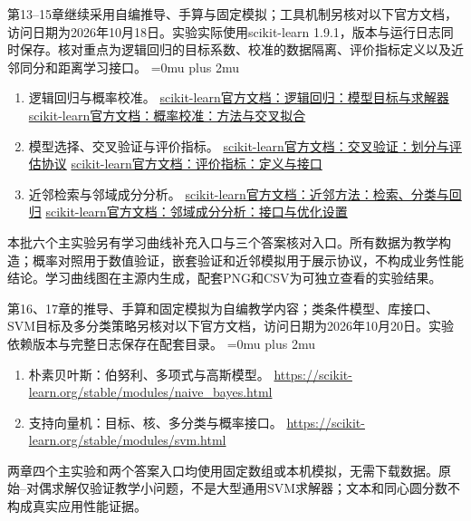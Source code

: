 \documentclass[UTF8,fontset=none,zihao=-4,a4paper]{ctexart}
\numberwithin{equation}{section}
\numberwithin{figure}{section}
\begin{document}
第13--15章继续采用自编推导、手算与固定模拟；工具机制另核对以下官方文档，访问日期为2026年10月18日。实验实际使用scikit-learn 1.9.1，版本与运行日志同时保存。核对重点为逻辑回归的目标系数、校准的数据隔离、评价指标定义以及近邻同分和距离学习接口。
\begingroup\Urlmuskip=0mu plus 2mu
\begin{enumerate}
\item 逻辑回归与概率校准。\newline
\href{https://scikit-learn.org/stable/modules/linear_model.html#logistic-regression}{scikit-learn官方文档：逻辑回归：模型目标与求解器}\newline
\href{https://scikit-learn.org/stable/modules/calibration.html}{scikit-learn官方文档：概率校准：方法与交叉拟合}
\item 模型选择、交叉验证与评价指标。\newline
\href{https://scikit-learn.org/stable/modules/cross_validation.html}{scikit-learn官方文档：交叉验证：划分与评估协议}\newline
\href{https://scikit-learn.org/stable/modules/model_evaluation.html}{scikit-learn官方文档：评价指标：定义与接口}
\item 近邻检索与邻域成分分析。\newline
\href{https://scikit-learn.org/stable/modules/neighbors.html}{scikit-learn官方文档：近邻方法：检索、分类与回归}\newline
\href{https://scikit-learn.org/stable/modules/generated/sklearn.neighbors.NeighborhoodComponentsAnalysis.html}{scikit-learn官方文档：邻域成分分析：接口与优化设置}
\end{enumerate}
\endgroup
本批六个主实验另有学习曲线补充入口与三个答案核对入口。所有数据为教学构造；概率对照用于数值验证，嵌套验证和近邻模拟用于展示协议，不构成业务性能结论。学习曲线图在主源内生成，配套PNG和CSV为可独立查看的实验结果。

第16、17章的推导、手算和固定模拟为自编教学内容；类条件模型、库接口、SVM目标及多分类策略另核对以下官方文档，访问日期为2026年10月20日。实验依赖版本与完整日志保存在配套目录。
\begingroup\Urlmuskip=0mu plus 2mu
\begin{enumerate}
\item 朴素贝叶斯：伯努利、多项式与高斯模型。\newline
\url{https://scikit-learn.org/stable/modules/naive_bayes.html}
\item 支持向量机：目标、核、多分类与概率接口。\newline
\url{https://scikit-learn.org/stable/modules/svm.html}
\end{enumerate}
\endgroup
两章四个主实验和两个答案入口均使用固定数组或本机模拟，无需下载数据。原始--对偶求解仅验证教学小问题，不是大型通用SVM求解器；文本和同心圆分数不构成真实应用性能证据。
\end{document}
